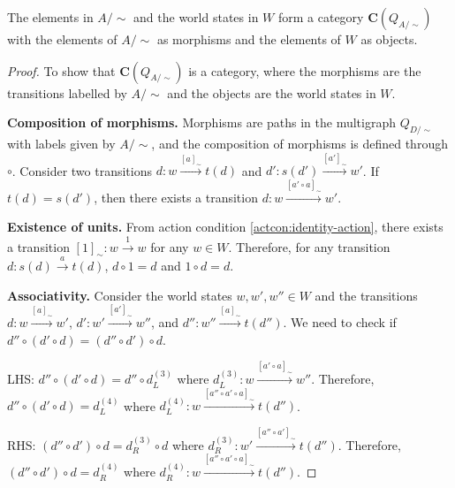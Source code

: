 \begin{proposition}
    The elements in $A/\sim$ and the world states in $W$ form a category $\textbf{C}(Q_{A/\sim})$ with the elements of $A/\sim$ as morphisms and the elements of $W$ as objects.
\end{proposition}
\begin{proof}
    To show that $\textbf{C}(Q_{A/\sim})$ is a category, where the morphisms are the transitions labelled by $A/\sim$ and the objects are the world states in $W$.


    \textbf{Composition of morphisms.}
    Morphisms are paths in the multigraph $Q_{D/\sim}$ with labels given by $A/\sim$, and the composition of morphisms is defined through $\circ$.
    Consider two transitions $d: w \xrightarrow{[a]_{\sim}} t(d)$ and $d': s(d') \xrightarrow{[a']_{\sim}} w'$.
    If $t(d) = s(d')$, then there exists a transition $d: w \xrightarrow{[a' \circ a]_{\sim}} w'$.
    
    \textbf{Existence of units.}
    From action condition \ref{actcon:identity-action}, there exists a transition $[1]_{\sim}: w \xrightarrow{1} w$ for any $w \in W$.
    Therefore, for any transition $d: s(d) \xrightarrow{a} t(d)$, $d \circ 1 = d$ and $1 \circ d = d$.

    \textbf{Associativity.}
    Consider the world states $w, w', w'' \in W$ and the transitions $d: w \xrightarrow{[a]_{\sim}} w'$, $d': w' \xrightarrow{[a']_{\sim}} w''$, and $d'': w'' \xrightarrow{[a]_{\sim}} t(d'')$.
    We need to check if $d'' \circ (d' \circ d) = (d'' \circ d') \circ d$.
    
    LHS: $d'' \circ (d' \circ d) = d'' \circ d^{(3)}_{L}$ where $d^{(3)}_{L}: w \xrightarrow{[a' \circ a]_{\sim}} w''$.
    Therefore, $d'' \circ (d' \circ d) = d^{(4)}_{L}$ where $d^{(4)}_{L}: w \xrightarrow{[a'' \circ a' \circ a]_{\sim}} t(d'')$.
    
    RHS: $(d'' \circ d') \circ d = d^{(3)}_{R} \circ d$ where $d^{(3)}_{R}: w' \xrightarrow{[a'' \circ a']_{\sim}} t(d'')$.
    Therefore, $(d'' \circ d') \circ d = d^{(4)}_{R}$ where $d^{(4)}_{R}: w \xrightarrow{[a'' \circ a' \circ a]_{\sim}} t(d'')$.
\end{proof}



